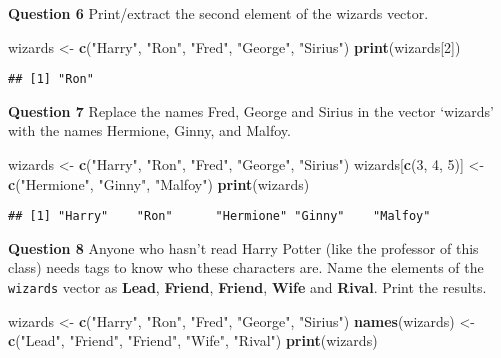 \documentclass[
]{article}
\newenvironment{Shaded}{\begin{snugshade}}{\end{snugshade}}
\newcommand{\DecValTok}[1]{\textcolor[rgb]{0.00,0.00,0.81}{#1}}
\newcommand{\KeywordTok}[1]{\textcolor[rgb]{0.13,0.29,0.53}{\textbf{#1}}}
\newcommand{\NormalTok}[1]{#1}
\newcommand{\StringTok}[1]{\textcolor[rgb]{0.31,0.60,0.02}{#1}}
\begin{document}
\textbf{Question 6} Print/extract the second element of the wizards
vector.

\begin{Shaded}
\begin{Highlighting}[]
\NormalTok{wizards <-}\StringTok{ }\KeywordTok{c}\NormalTok{(}\StringTok{"Harry"}\NormalTok{, }\StringTok{"Ron"}\NormalTok{, }\StringTok{"Fred"}\NormalTok{, }\StringTok{"George"}\NormalTok{, }\StringTok{"Sirius"}\NormalTok{)}
\KeywordTok{print}\NormalTok{(wizards[}\DecValTok{2}\NormalTok{])}
\end{Highlighting}
\end{Shaded}

\begin{verbatim}
## [1] "Ron"
\end{verbatim}

\textbf{Question 7} Replace the names Fred, George and Sirius in the
vector `wizards' with the names Hermione, Ginny, and Malfoy.

\begin{Shaded}
\begin{Highlighting}[]
\NormalTok{wizards <-}\StringTok{ }\KeywordTok{c}\NormalTok{(}\StringTok{"Harry"}\NormalTok{, }\StringTok{"Ron"}\NormalTok{, }\StringTok{"Fred"}\NormalTok{, }\StringTok{"George"}\NormalTok{, }\StringTok{"Sirius"}\NormalTok{)}
\NormalTok{wizards[}\KeywordTok{c}\NormalTok{(}\DecValTok{3}\NormalTok{, }\DecValTok{4}\NormalTok{, }\DecValTok{5}\NormalTok{)] <-}\StringTok{ }\KeywordTok{c}\NormalTok{(}\StringTok{"Hermione"}\NormalTok{, }\StringTok{"Ginny"}\NormalTok{, }\StringTok{"Malfoy"}\NormalTok{)}
\KeywordTok{print}\NormalTok{(wizards)}
\end{Highlighting}
\end{Shaded}

\begin{verbatim}
## [1] "Harry"    "Ron"      "Hermione" "Ginny"    "Malfoy"
\end{verbatim}

\textbf{Question 8} Anyone who hasn't read Harry Potter (like the
professor of this class) needs tags to know who these characters are.
Name the elements of the \texttt{wizards} vector as \textbf{Lead},
\textbf{Friend}, \textbf{Friend}, \textbf{Wife} and \textbf{Rival}.
Print the results.

\begin{Shaded}
\begin{Highlighting}[]
\NormalTok{wizards <-}\StringTok{ }\KeywordTok{c}\NormalTok{(}\StringTok{"Harry"}\NormalTok{, }\StringTok{"Ron"}\NormalTok{, }\StringTok{"Fred"}\NormalTok{, }\StringTok{"George"}\NormalTok{, }\StringTok{"Sirius"}\NormalTok{)}
\KeywordTok{names}\NormalTok{(wizards) <-}\StringTok{ }\KeywordTok{c}\NormalTok{(}\StringTok{"Lead"}\NormalTok{, }\StringTok{"Friend"}\NormalTok{, }\StringTok{"Friend"}\NormalTok{, }\StringTok{"Wife"}\NormalTok{, }\StringTok{"Rival"}\NormalTok{)}
\KeywordTok{print}\NormalTok{(wizards)}
\end{Highlighting}
\end{Shaded}
\end{document}
